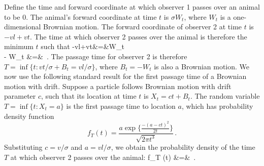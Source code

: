 \documentclass[useAMS, usenatbib, referee]{biom}\usepackage[]{graphicx}\usepackage[]{color}
\begin{document}
Define the time and forward coordinate at which observer 1 passes over an animal to be 0. The animal's forward coordinate at time $t$ is $\sigma W_t$, where $W_t$ is a one-dimensional Brownian motion. The forward coordinate of observer 2 at time $t$ is $-vl+vt$. The time at which observer 2 passes over the animal is therefore the minimum $t$ such that
\be
-vl+vt&=&\sigma W_t \nonumber \\
\Rightarrow \;\;\; - W_t &=& \,.
\ee
\noindent
The passage time for observer 2 is therefore $T=\inf\{t: vt/\sigma + B_t = vl/\sigma\}$, where $B_t=-W_t$ is also a Brownian motion. We now use the following standard result for the first passage time of a Brownian motion with drift. Suppose a particle follows Brownian motion with drift parameter $c$, such that its location at time $t$ is $X_t=ct+B_t$. The random variable $T=\inf\{t: X_t=a\}$ is the first passage time to location $a$, which has probability density function
\begin{equation}
f_{T} (t) = \frac{ a \exp \Big\{ \frac{- (a-ct)^2}{2t} \Big\} }{\sqrt{2 \pi t^3}}\,.
\end{equation}
\noindent
Substituting $c=v/\sigma$ and $a=vl/\sigma$, we obtain the probability density of the time $T$ at which observer 2 passes over the animal:
\be
f_{T} (t)
&=&
\,.
\ee




\end{document}
